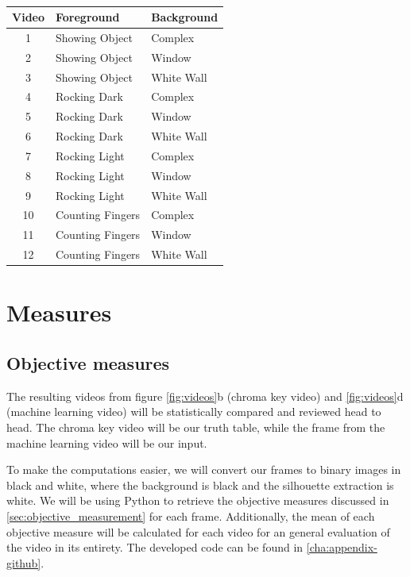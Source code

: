 \begin{table}[H]
    \centering
    \begin{tabular}{|c|p{4cm}|p{4cm}|} 
         \hline
         \textbf{Video} & \textbf{Foreground} & \textbf{Background} \\ [0.5ex] 
         \hline\hline
         1 & Showing Object & Complex \\
         \hline
         2 & Showing Object & Window \\
         \hline
         3 & Showing Object & White Wall \\
         \hline
         4 & Rocking Dark & Complex \\
         \hline
         5 & Rocking Dark & Window \\
         \hline
         6 & Rocking Dark & White Wall \\
         \hline
         7 & Rocking Light & Complex \\
         \hline
         8 & Rocking Light & Window \\
         \hline
         9 & Rocking Light & White Wall \\
         \hline
         10 & Counting Fingers & Complex \\
         \hline
         11 & Counting Fingers & Window \\
         \hline
         12 & Counting Fingers & White Wall \\
         \hline
    \end{tabular}
    \caption{}
    \label{tab:video_list}
\end{table}


\section{Measures}
\subsection{Objective measures}
The resulting videos from figure \ref{fig:videos}b (chroma key video) and \ref{fig:videos}d (machine learning video) will be statistically compared and reviewed head to head. The chroma key video will be our truth table, while the frame from the machine learning video will be our input. 

To make the computations easier, we will convert our frames to binary images in black and white, where the background is black and the silhouette extraction is white. We will be using Python to retrieve the objective measures discussed in \autoref{sec:objective_measurement} for each frame. Additionally, the mean of each objective measure will be calculated for each video for an general evaluation of the video in its entirety. The developed code can be found in \autoref{cha:appendix-github}.



